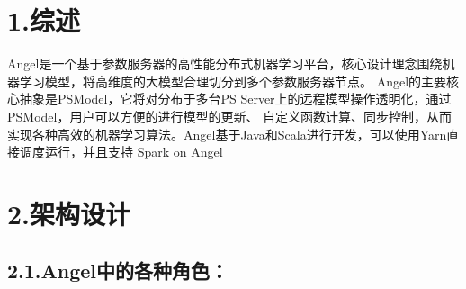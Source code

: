 \documentclass{article}
\begin{document}
\mdxtitleblockstart{}
\mdxauthorstart{}
\mdxauthorend\mdtitleauthorrunning{}{}\mdxtitleblockend%

\section{1.\hspace*{0.5em}综述}\label{section}%

\noindent{}\hspace*{1em}\hspace*{1em}Angel是一个基于参数服务器的高性能分布式机器学习平台，核心设计理念围绕机器学习模型，将高维度的大模型合理切分到多个参数服务器节点。
Angel的主要核心抽象是PSModel，它将对分布于多台PS Server上的远程模型操作透明化，通过PSModel，用户可以方便的进行模型的更新、
自定义函数计算、同步控制，从而实现各种高效的机器学习算法。Angel基于Java和Scala进行开发，可以使用Yarn直接调度运行，并且支持
Spark on Angel%

\section{2.\hspace*{0.5em}架构设计}\label{section}%

\subsection{2.1.\hspace*{0.5em}Angel中的各种角色：}\label{sec-angel}%
\end{document}

